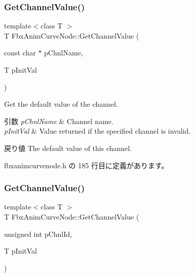 \subsubsection{\texorpdfstring{Get\+Channel\+Value()}{GetChannelValue()}\hspace{0.1cm}{\footnotesize\ttfamily [1/2]}}
{\footnotesize\ttfamily template$<$class T $>$ \\
T Fbx\+Anim\+Curve\+Node\+::\+Get\+Channel\+Value (\begin{DoxyParamCaption}\item[{const char $\ast$}]{p\+Chnl\+Name,  }\item[{T}]{p\+Init\+Val }\end{DoxyParamCaption})\hspace{0.3cm}{\ttfamily [inline]}}

Get the default value of the channel. 
\begin{DoxyParams}{引数}
{\em p\+Chnl\+Name} & Channel name. \\
\hline
{\em p\+Init\+Val} & Value returned if the specified channel is invalid. \\
\hline
\end{DoxyParams}
\begin{DoxyReturn}{戻り値}
The default value of this channel. 
\end{DoxyReturn}


 fbxanimcurvenode.\+h の 185 行目に定義があります。

\mbox{\label{class_fbx_anim_curve_node_a1fb96d04b8c53ec130c5be376b923c6c}} 
\subsubsection{\texorpdfstring{Get\+Channel\+Value()}{GetChannelValue()}\hspace{0.1cm}{\footnotesize\ttfamily [2/2]}}
{\footnotesize\ttfamily template$<$class T $>$ \\
T Fbx\+Anim\+Curve\+Node\+::\+Get\+Channel\+Value (\begin{DoxyParamCaption}\item[{unsigned int}]{p\+Chnl\+Id,  }\item[{T}]{p\+Init\+Val }\end{DoxyParamCaption})\hspace{0.3cm}{\ttfamily [inline]}}

